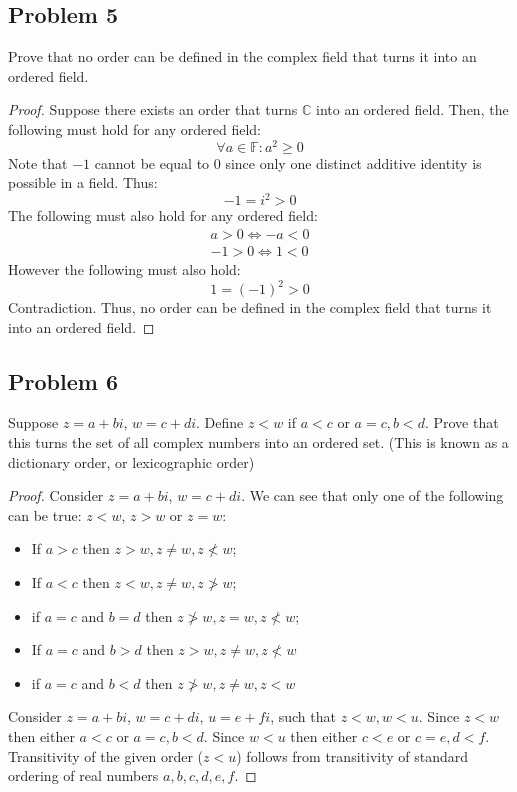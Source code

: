 \documentclass{article}
\newcommand{\C}{\mathbb{C}}
\newcommand{\F}{\mathbb{F}}
\begin{document}
\subsection*{Problem 5}

\begin{tcolorbox}
Prove that no order can be defined in the complex field that turns it into an ordered field.
\end{tcolorbox}

\begin{proof}
Suppose there exists an order that turns $\C$ into an ordered field.
Then, the following must hold for any ordered field:
\[ \forall a \in \F : a^2 \geq 0 \]
Note that $-1$ cannot be equal to $0$ since only one distinct additive identity is possible in a field.
Thus:
\[ -1 = i^2 > 0 \]
The following must also hold for any ordered field:
\begin{gather*}
    a > 0 \iff -a < 0 \\
    -1 > 0 \iff 1 < 0    
\end{gather*}
However the following must also hold:
\[ 1 = (-1)^2 > 0 \]
Contradiction.
Thus, no order can be defined in the complex field that turns it into an ordered field.

\end{proof}


\subsection*{Problem 6}

\begin{tcolorbox}
Suppose $z = a + bi$, $w = c + di$.
Define $z < w$ if $a < c$ or $a = c, b < d$.
Prove that this turns the set of all complex numbers into an ordered set.
(This is known as a dictionary order, or lexicographic order)
\end{tcolorbox}

\begin{proof}

Consider $z = a + bi$, $w = c + di$.
We can see that only one of the following can be true: $z<w$, $z>w$ or $z=w$:
\begin{itemize}
    \item If $a > c$ then $z>w, z \neq w, z \not< w$;
    \item If $a < c$ then $z<w, z \neq w, z \not> w$;
    \item if $a = c$ and $b = d$ then $z \not> w, z = w, z \not< w$;
    \item If $a = c$ and $b > d$ then $z > w, z \neq w, z \not< w$
    \item if $a = c$ and $b < d$ then $z \not> w, z \neq w, z < w$
\end{itemize}

Consider $z = a + bi$, $w = c + di$, $u = e + fi$, such that $z<w, w<u$. Since $z<w$  then either $a<c$ or $a=c, b<d$.
Since $w<u$  then either $c<e$ or $c=e, d<f$.
Transitivity of the given order ($z<u$) follows from transitivity of standard ordering of real numbers $a,b,c,d,e,f$.

\end{proof}
\end{document}
